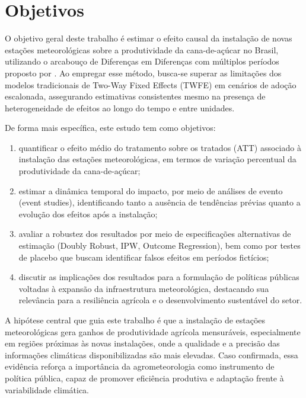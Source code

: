 \documentclass[
	12pt,				%
	openright,			%
	oneside,			%
	a4paper,			%
	english,			%
	french,				%
	spanish,			%
	brazil				%
	]{abntex2}
\begin{document}
\chapter{Objetivos}

O objetivo geral deste trabalho é estimar o efeito causal da instalação de novas estações meteorológicas sobre a produtividade da cana-de-açúcar no Brasil, utilizando o arcabouço de Diferenças em Diferenças com múltiplos períodos proposto por . Ao empregar esse método, busca-se superar as limitações dos modelos tradicionais de Two-Way Fixed Effects (TWFE) em cenários de adoção escalonada, assegurando estimativas consistentes mesmo na presença de heterogeneidade de efeitos ao longo do tempo e entre unidades.

De forma mais específica, este estudo tem como objetivos:

\begin{enumerate}[label=(\roman*)]
\item quantificar o efeito médio do tratamento sobre os tratados (ATT) associado à instalação das estações meteorológicas, em termos de variação percentual da produtividade da cana-de-açúcar;
\item estimar a dinâmica temporal do impacto, por meio de análises de evento (event studies), identificando tanto a ausência de tendências prévias quanto a evolução dos efeitos após a instalação;
\item avaliar a robustez dos resultados por meio de especificações alternativas de estimação (Doubly Robust, IPW, Outcome Regression), bem como por testes de placebo que buscam identificar falsos efeitos em períodos fictícios;
\item discutir as implicações dos resultados para a formulação de políticas públicas voltadas à expansão da infraestrutura meteorológica, destacando sua relevância para a resiliência agrícola e o desenvolvimento sustentável do setor.
\end{enumerate}

A hipótese central que guia este trabalho é que a instalação de estações meteorológicas gera ganhos de produtividade agrícola mensuráveis, especialmente em regiões próximas às novas instalações, onde a qualidade e a precisão das informações climáticas disponibilizadas são mais elevadas. Caso confirmada, essa evidência reforça a importância da agrometeorologia como instrumento de política pública, capaz de promover eficiência produtiva e adaptação frente à variabilidade climática.
\end{document}
